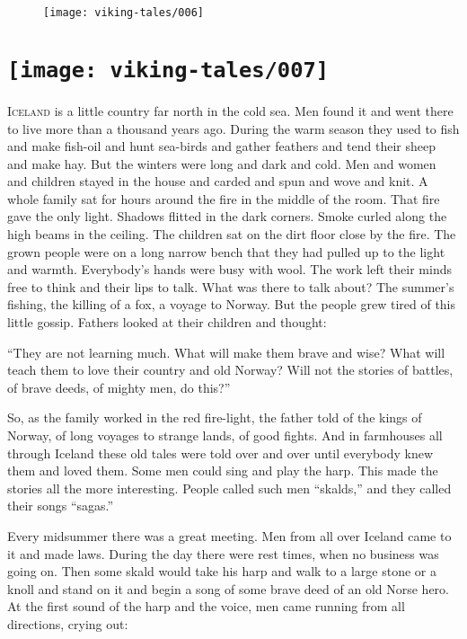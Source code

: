\begin{figure}
    \centering
    \texttt{[image: viking-tales/006]}
\end{figure}
\listoffigures

\section[What the Sagas Were]{
    \texttt{[image: viking-tales/007]}}

\lettrine{I}{celand} is a little country far north in the cold sea. Men
found it and went there to live more than a thousand years ago. During
the warm season they used to fish and make fish-oil and hunt sea-birds
and gather feathers and tend their sheep and make hay. But the winters
were long and dark and cold. Men and women and children stayed in the
house and carded and spun and wove and knit. A whole family sat for hours
around the fire in the middle of the room. That fire gave the only light.
Shadows flitted in the dark corners. Smoke curled along the high beams
in the ceiling. The children sat on the dirt floor close by the fire.
The grown people were on a long narrow bench that they had pulled up to
the light and warmth. Everybody's hands were busy with wool. The work
left their minds free to think and their lips to talk. What was there to
talk about? The summer's fishing, the killing of a fox, a voyage to
Norway. But the people grew tired of this little gossip. Fathers looked
at their children and thought:

``They are not learning much. What will make them brave and wise? What
will teach them to love their country and old Norway? Will not the
stories of battles, of brave deeds, of mighty men, do this?''

So, as the family worked in the red fire-light, the father told of the
kings of Norway, of long voyages to strange lands, of good fights. And
in farmhouses all through Iceland these old tales were told over and
over until everybody knew them and loved them. Some men could sing and
play the harp. This made the stories all the more interesting. People
called such men ``skalds,'' and they called their songs ``sagas.''

Every midsummer there was a great meeting. Men from all over Iceland
came to it and made laws. During the day there were rest times, when no
business was going on. Then some skald would take his harp and walk to a
large stone or a knoll and stand on it and begin a song of some brave
deed of an old Norse hero. At the first sound of the harp and the voice,
men came running from all directions, crying out:

